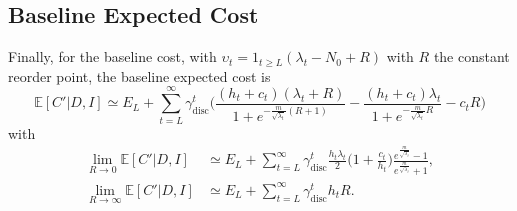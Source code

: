 \subsection{Baseline Expected Cost}
Finally, for the baseline cost, with $\upsilon_t= 1_{t\geq L}(\lambda_t-N_0+R)$ with $R$ the constant reorder point, the baseline expected cost is
\begin{equation}
		\mathbb{E}[C'|D,I] \simeq E_L+\sum_{t=L}^{\infty} \gamma_{\text{disc}}^{t} \bigg( 
		\frac{(h_t+c_t)(\lambda_t+R)}{1+e^{-\frac{m}{\sqrt{\lambda_t}}(R+1)}}- \frac{(h_t+c_t)\lambda_t}{1+e^{-\frac{m}{\sqrt{\lambda_t}}R}} - c_tR\bigg)
\end{equation}
with
\begin{equation}
	\begin{split}
			\lim\limits_{R\rightarrow 0} \mathbb{E}[C'|D,I] & \simeq E_L+\sum_{t=L}^{\infty} \gamma_{\text{disc}}^{t}\frac{h_t\lambda_t}{2}\bigg(1+\frac{c_t}{h_t}\bigg)  
			\frac{e^{\frac{m}{\sqrt{\lambda_t}}}-1}{e^{\frac{m}{\sqrt{\lambda_t}}}+1},\\
			\lim\limits_{R\rightarrow \infty} \mathbb{E}[C'|D,I] & \simeq E_L+\sum_{t=L}^{\infty} \gamma_{\text{disc}}^{t} 
			h_tR.\\
	\end{split}
\end{equation}


